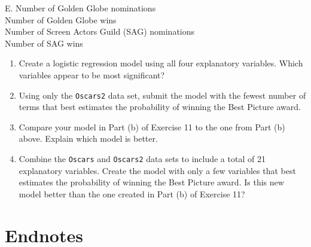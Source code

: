 \documentclass[
]{report}
\newcounter{excount}
\renewcommand{\theexcount}{E\arabic{excount}}
\begin{document}
\begin{list}{\theexcount.}{ \setlength{\itemsep}{1.2em}}
Number of Golden Globe nominations \\
Number of Golden Globe wins \\
Number of Screen Actors Guild (SAG) nominations \\
Number of SAG wins

  \begin{enumerate}
    \item Create a logistic regression model using all four explanatory variables. Which variables appear to be most significant?
    \item Using only the \texttt{Oscars2} data set, submit the model with the fewest number of terms that best estimates the probability of winning the Best Picture award.
    \item Compare your model in Part (b) of Exercise 11 to the one from Part (b) above. Explain which model is better.
    \item Combine the \texttt{Oscars} and \texttt{Oscars2} data sets to include a total of 21 explanatory variables. Create the model with only a few variables that best estimates the probability of winning the Best Picture award. Is this new model better than the one created in Part (b) of Exercise 11?
  \end{enumerate}

\end{list}

\hypertarget{endnotes-5}{%
\section*{\texorpdfstring{\textbf{Endnotes}}{Endnotes}}\label{endnotes-5}}
\end{document}
